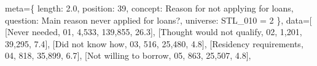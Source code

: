 \documentclass[
  11pt,
  a4paper,
]{article}
\newenvironment{Shaded}{\begin{snugshade}}{\end{snugshade}}
\newcommand{\NormalTok}[1]{\textcolor[rgb]{0.00,0.23,0.31}{#1}}
\newcommand{\OperatorTok}[1]{\textcolor[rgb]{0.37,0.37,0.37}{#1}}
\newcommand{\StringTok}[1]{\textcolor[rgb]{0.13,0.47,0.30}{#1}}
\begin{document}
\begin{Shaded}
\begin{Highlighting}[]
\NormalTok{                meta}\OperatorTok{=}\NormalTok{\{}
                    \StringTok{\textquotesingle{}length\textquotesingle{}}\NormalTok{: }\StringTok{\textquotesingle{}2.0\textquotesingle{}}\NormalTok{, }\StringTok{\textquotesingle{}position\textquotesingle{}}\NormalTok{: }\StringTok{\textquotesingle{}39\textquotesingle{}}\NormalTok{,}
                    \StringTok{\textquotesingle{}concept\textquotesingle{}}\NormalTok{: }\StringTok{\textquotesingle{}Reason for not applying for loans\textquotesingle{}}\NormalTok{,}
                    \StringTok{\textquotesingle{}question\textquotesingle{}}\NormalTok{: }\StringTok{\textquotesingle{}Main reason never applied for loans?\textquotesingle{}}\NormalTok{,}
                    \StringTok{\textquotesingle{}universe\textquotesingle{}}\NormalTok{: }\StringTok{\textquotesingle{}STL\_010 = 2\textquotesingle{}}
\NormalTok{                \},}
\NormalTok{                data}\OperatorTok{=}\NormalTok{[}
\NormalTok{                    [}\StringTok{\textquotesingle{}Never needed\textquotesingle{}}\NormalTok{, }\StringTok{\textquotesingle{}01\textquotesingle{}}\NormalTok{, }\StringTok{\textquotesingle{}4,533\textquotesingle{}}\NormalTok{, }\StringTok{\textquotesingle{}139,855\textquotesingle{}}\NormalTok{, }\StringTok{\textquotesingle{}26.3\textquotesingle{}}\NormalTok{],}
\NormalTok{                    [}\StringTok{\textquotesingle{}Thought would not qualify\textquotesingle{}}\NormalTok{, }\StringTok{\textquotesingle{}02\textquotesingle{}}\NormalTok{, }\StringTok{\textquotesingle{}1,201\textquotesingle{}}\NormalTok{, }\StringTok{\textquotesingle{}39,295\textquotesingle{}}\NormalTok{, }\StringTok{\textquotesingle{}7.4\textquotesingle{}}\NormalTok{],}
\NormalTok{                    [}\StringTok{\textquotesingle{}Did not know how\textquotesingle{}}\NormalTok{, }\StringTok{\textquotesingle{}03\textquotesingle{}}\NormalTok{, }\StringTok{\textquotesingle{}516\textquotesingle{}}\NormalTok{, }\StringTok{\textquotesingle{}25,480\textquotesingle{}}\NormalTok{, }\StringTok{\textquotesingle{}4.8\textquotesingle{}}\NormalTok{],}
\NormalTok{                    [}\StringTok{\textquotesingle{}Residency requirements\textquotesingle{}}\NormalTok{, }\StringTok{\textquotesingle{}04\textquotesingle{}}\NormalTok{, }\StringTok{\textquotesingle{}818\textquotesingle{}}\NormalTok{, }\StringTok{\textquotesingle{}35,899\textquotesingle{}}\NormalTok{, }\StringTok{\textquotesingle{}6.7\textquotesingle{}}\NormalTok{],}
\NormalTok{                    [}\StringTok{\textquotesingle{}Not willing to borrow\textquotesingle{}}\NormalTok{, }\StringTok{\textquotesingle{}05\textquotesingle{}}\NormalTok{, }\StringTok{\textquotesingle{}863\textquotesingle{}}\NormalTok{, }\StringTok{\textquotesingle{}25,507\textquotesingle{}}\NormalTok{, }\StringTok{\textquotesingle{}4.8\textquotesingle{}}\NormalTok{],}

\end{Highlighting}
\end{Shaded}
\end{document}
